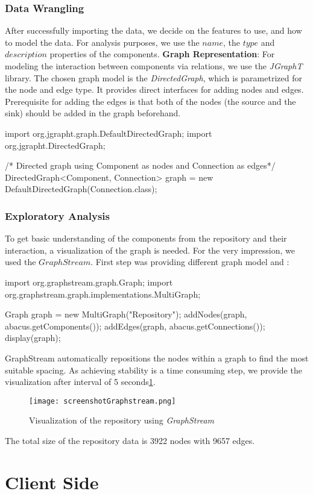 \subsubsection{Data Wrangling}
After successfully importing the data, we decide on the features to use, and how to model the data. 
For analysis purposes, we use the $name$, the $type$ and $description$ properties of the components. 
\textbf{Graph Representation}:
For modeling the interaction between components via relations, we use the \emph{JGraphT} library. 
The chosen graph model is the \emph{DirectedGraph}, which is parametrized for the node and edge type. 
It provides direct interfaces for adding nodes and edges. 
Prerequisite for adding the edges is that both of the nodes (the source and the sink) should be added in the graph beforehand.

\begin{lstlistingJava}{}
		import org.jgrapht.graph.DefaultDirectedGraph;
		import org.jgrapht.DirectedGraph;
		
		/* Directed graph using Component as nodes 
		and Connection as edges*/
		DirectedGraph<Component, Connection> graph 
			= new DefaultDirectedGraph(Connection.class);
\end{lstlistingJava}

\subsubsection{Exploratory Analysis}
To get basic understanding of the components from the repository and their interaction, a visualization of the graph is needed. 
For the very impression, we used the $GraphStream$. 
First step was providing different graph model and :
\begin{lstlistingJava}{}
		import org.graphstream.graph.Graph;
		import org.graphstream.graph.implementations.MultiGraph;
		
		Graph graph = new MultiGraph("Repository");
		addNodes(graph, abacus.getComponents());
		addEdges(graph, abacus.getConnections());
		display(graph);
\end{lstlistingJava}
GraphStream automatically repositions the nodes within a graph to find the most suitable spacing.
As achieving stability is a time consuming step, we provide the visualization after interval of 5 seconds\ref{fig:graphstream}.
\begin{figure}[ht]
	\centering
	\texttt{[image: screenshotGraphstream.png]}
	\caption{Visualization of the repository using \emph{GraphStream}} 
	\label{fig:graphstream}
\end{figure} 

The total size of the repository data is 3922 nodes with 9657 edges.
\section{Client Side}
